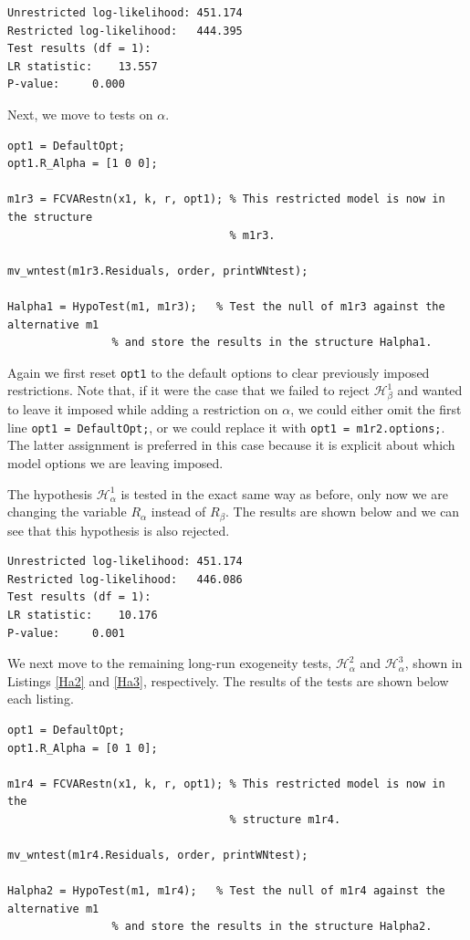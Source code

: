 \documentclass[10pt]{article}
\begin{document}
\begin{verbatim}
Unrestricted log-likelihood: 451.174
Restricted log-likelihood:   444.395
Test results (df = 1):
LR statistic: 	 13.557
P-value: 	 0.000
\end{verbatim}

Next, we move to tests on $\alpha$. 

\begin{lstlisting}[frame=single,caption={Hypothesis $\mathscr{H}_{\alpha}^1$}, label = Ha1]
%% Test restriction that political variable is long-run exogenous.
opt1 = DefaultOpt;
opt1.R_Alpha = [1 0 0];

m1r3 = FCVARestn(x1, k, r, opt1); % This restricted model is now in the structure 
                                  % m1r3.

mv_wntest(m1r3.Residuals, order, printWNtest);

Halpha1 = HypoTest(m1, m1r3); 	% Test the null of m1r3 against the alternative m1 
				% and store the results in the structure Halpha1.
\end{lstlisting}

Again we first reset \verb|opt1| to the default options to clear previously imposed restrictions. Note that, if it were the case that we failed to reject $\mathscr{H}_{\beta}^1$ and wanted to leave it imposed while adding a restriction on $\alpha$, we could either omit the first line \verb|opt1 = DefaultOpt;|, or we could replace it with \verb|opt1 = m1r2.options;|. The latter assignment is preferred in this case because it is explicit about which model options we are leaving imposed.

The hypothesis $\mathscr{H}_{\alpha}^1$ is tested in the exact same way as before, only now we are changing the variable $R_{\alpha}$ instead of $R_{\beta}$. The results are shown below and we can see that this hypothesis is also rejected.

\begin{verbatim}
Unrestricted log-likelihood: 451.174
Restricted log-likelihood:   446.086
Test results (df = 1):
LR statistic: 	 10.176
P-value: 	 0.001
\end{verbatim}

We next move to the remaining long-run exogeneity tests, $\mathscr{H}_{\alpha}^2$ and $\mathscr{H}_{\alpha}^3$, shown in Listings \ref{Ha2} and \ref{Ha3}, respectively. The results of the tests are shown below each listing.

\begin{lstlisting}[frame=single,caption={Hypothesis $\mathscr{H}_{\alpha}^2$}, label = Ha2]
%% Test restriction that interest-rate is long-run exogenous.
opt1 = DefaultOpt;
opt1.R_Alpha = [0 1 0];

m1r4 = FCVARestn(x1, k, r, opt1); % This restricted model is now in the 
                                  % structure m1r4.

mv_wntest(m1r4.Residuals, order, printWNtest);

Halpha2 = HypoTest(m1, m1r4); 	% Test the null of m1r4 against the alternative m1 
				% and store the results in the structure Halpha2.
\end{lstlisting}
\end{document}
